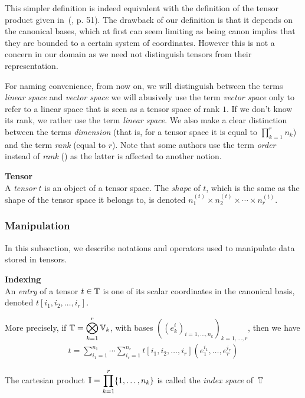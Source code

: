 \begin{remark}
This simpler definition is indeed equivalent with the definition of the tensor product given in~(\cite{hackbusch2012tensor}, p. 51). The drawback of our definition is that it depends on the canonical bases, which at first can seem limiting as being canon implies that they are bounded to a certain system of coordinates. However this is not a concern in our domain as we need not distinguish tensors from their representation.
\end{remark}

\begin{remark}
For naming convenience, from now on, we will distinguish between the terms \emph{linear space} and \emph{vector space} \ie we will abusively use the term \emph{vector space} only to refer to a linear space that is seen as a tensor space of rank $1$. If we don't know its rank, we rather use the term \emph{linear space}.
We also make a clear distinction between the terms \emph{dimension} (that is, for a tensor space it is equal to $\displaystyle \prod_{k=1}^r n_k$) and the term \emph{rank} (equal to $r$). Note that some authors use the term \emph{order} instead of \emph{rank} (\eg \cite{hackbusch2012tensor}) as the latter is affected to another notion.
\end{remark}

\begin{definition}\textbf{Tensor}\\
A \emph{tensor} $t$ is an object of a tensor space. The \emph{shape} of $t$, which is the same as the shape of the tensor space it belongs to, is denoted $n_1^{(t)} \times n_2^{(t)} \times \cdots \times n_r^{(t)}$.
\end{definition}

%
\subsubsection{Manipulation}

In this subsection, we describe notations and operators used to manipulate data stored in tensors.

\begin{definition}\textbf{Indexing}\\
An \emph{entry} of a tensor $t \in \mathbb{T}$ is one of its scalar coordinates in the canonical basis, denoted $t[i_1, i_2, \ldots, i_r]$.

More precisely, if $\mathbb{T} = \displaystyle \bigotimes_{k=1}^r \mathbb{V}_k$, with bases $((e_k^i)_{i=1,\ldots,n_k})_{k=1,\ldots,r}$, then we have
\begin{gather*}
t =  \displaystyle \sum_{i_1=1}^{n_1} \cdots \sum_{i_r=1}^{n_r} t[i_1, i_2, \ldots, i_r] (e_1^{i_1}, \ldots, e_r^{i_r})
\end{gather*}

The cartesian product $\mathbb{I}=\displaystyle \prod_{k=1}^r \{1, \ldots, n_k \}$ is called the \emph{index space} of~$\mathbb{T}$
\end{definition}

